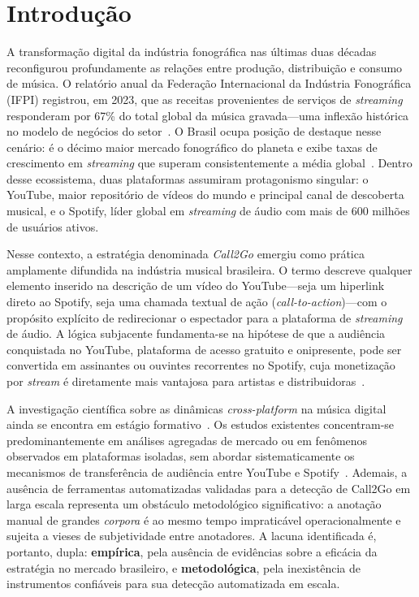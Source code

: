 ﻿\documentclass[12pt]{article}
\begin{document}
\section{Introdução}
\label{sec:intro}

A transformação digital da indústria fonográfica nas últimas duas décadas
reconfigurou profundamente as relações entre produção, distribuição e consumo
de música. O relatório anual da Federação Internacional da Indústria
Fonográfica (IFPI) registrou, em 2023, que as receitas provenientes de
serviços de \textit{streaming} responderam por 67\% do total global da música
gravada---uma inflexão histórica no modelo de negócios do
setor~\cite{ifpi2023}. O Brasil ocupa posição de destaque nesse cenário: é o
décimo maior mercado fonográfico do planeta e exibe taxas de crescimento em
\textit{streaming} que superam consistentemente a média
global~\cite{ifpi2023}. Dentro desse ecossistema, duas plataformas assumiram
protagonismo singular: o YouTube, maior repositório de vídeos do mundo e
principal canal de descoberta musical, e o Spotify, líder global em
\textit{streaming} de áudio com mais de 600 milhões de usuários ativos.

Nesse contexto, a estratégia denominada \textit{Call2Go} emergiu como prática
amplamente difundida na indústria musical brasileira. O termo descreve qualquer
elemento inserido na descrição de um vídeo do YouTube---seja um hiperlink
direto ao Spotify, seja uma chamada textual de ação
(\textit{call-to-action})---com o propósito explícito de redirecionar o
espectador para a plataforma de \textit{streaming} de áudio. A lógica
subjacente fundamenta-se na hipótese de que a audiência conquistada no YouTube,
plataforma de acesso gratuito e onipresente, pode ser convertida em assinantes
ou ouvintes recorrentes no Spotify, cuja monetização por \textit{stream} é
diretamente mais vantajosa para artistas e distribuidoras~\cite{wlomert2016}.

A investigação científica sobre as dinâmicas \textit{cross-platform} na música
digital ainda se encontra em estágio formativo~\cite{aguiar2021}. Os estudos
existentes concentram-se predominantemente em análises agregadas de mercado ou
em fenômenos observados em plataformas isoladas, sem abordar
sistematicamente os mecanismos de transferência de audiência entre YouTube e
Spotify~\cite{napoli2010}. Ademais, a ausência de ferramentas automatizadas
validadas para a detecção de Call2Go em larga escala representa um obstáculo
metodológico significativo: a anotação manual de grandes \textit{corpora} é ao
mesmo tempo impraticável operacionalmente e sujeita a vieses de subjetividade
entre anotadores. A lacuna identificada é, portanto, dupla: \textbf{empírica},
pela ausência de evidências sobre a eficácia da estratégia no mercado
brasileiro, e \textbf{metodológica}, pela inexistência de instrumentos
confiáveis para sua detecção automatizada em escala.
\end{document}
